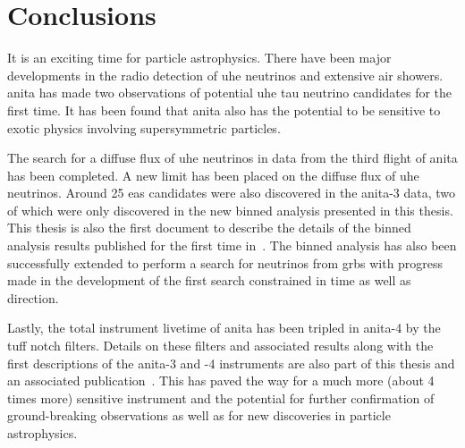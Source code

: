 \section{Conclusions}

It is an exciting time for particle astrophysics.
There have been major developments in the radio detection of \gls{uhe} neutrinos and extensive air showers. \gls{anita} has made two observations of potential \gls{uhe} tau neutrino candidates for the first time. It has been found that \gls{anita} also has the potential to be sensitive to exotic physics involving supersymmetric particles. 

The search for a diffuse flux of \gls{uhe} neutrinos in data from the third flight of \gls{anita} has been completed. A new limit has been placed on the diffuse flux of \gls{uhe} neutrinos. Around 25 \gls{eas} candidates were also discovered in the \gls{anita}-3 data, two of which were only discovered in the new binned analysis presented in this thesis. This thesis is also the first document to describe the details of the binned analysis results published for the first time in~\cite{diffuse}. The binned analysis has also been successfully extended to perform a search for neutrinos from \gls{grbs} with progress made in the development of the first search constrained in time as well as direction.

Lastly, the total instrument livetime of \gls{anita} has been tripled in \gls{anita}-4 by the \gls{tuff} notch filters. Details on these filters and associated results along with the first descriptions of the \gls{anita}-3 and -4 instruments are also part of this thesis and an associated publication~\cite{tuff}. This has paved the way for a much more (about 4 times more) sensitive instrument and the potential for further confirmation of ground-breaking observations as well as for new discoveries in particle astrophysics. 